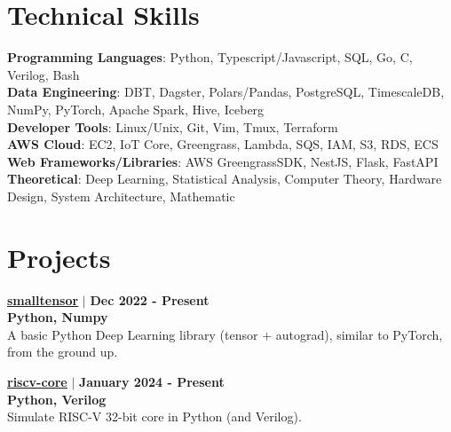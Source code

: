 \documentclass[letterpaper,9pt]{article}
\begin{document}
\section{\texorpdfstring{\textbf{\color{CornflowerBlue}Technical Skills}}{Technical Skills}}
 \begin{itemize}[leftmargin=0.15in, label={}]
    \small{\item{
     \textbf{Programming Languages}{: Python, Typescript/Javascript, SQL, Go, C, Verilog, Bash} \\
     \textbf{Data Engineering}{: DBT, Dagster, Polars/Pandas, PostgreSQL, TimescaleDB, NumPy, PyTorch, Apache Spark, Hive, Iceberg} \\
     \textbf{Developer Tools}{: Linux/Unix, Git, Vim, Tmux, Terraform} \\
     \textbf{AWS Cloud}{: EC2, IoT Core, Greengrass, Lambda, SQS, IAM, S3, RDS, ECS} \\
     \textbf{Web Frameworks/Libraries}{: AWS GreengrassSDK, NestJS, Flask, FastAPI} \\
     \textbf{Theoretical}{: Deep Learning, Statistical Analysis, Computer Theory, Hardware Design, System Architecture, Mathematic} \\
    }}
 \end{itemize}


\newpage
\section{\texorpdfstring{\textbf{\color{CornflowerBlue}Projects}}{Projects}}
\vspace{-15pt}
\setlength{\leftskip}{0.15in}
  \begin{multicols}{2}
    \textbf{\color{Green}\href{https://github.com/hbhungg/smalltensor}{\underline{smalltensor}}} $|$ \textbf{Dec 2022 - Present} \\ \vspace{1pt}
    {\footnotesize \textbf{Python, Numpy}} \\ \vspace{2pt}
    {\small A basic Python Deep Learning library (tensor + autograd), similar to PyTorch, from the ground up.} \\
    \columnbreak

    \textbf{\color{Green}\href{https://github.com/hbhungg/riscv-core}{\underline{riscv-core}}} $|$ \textbf{January 2024 - Present} \\ \vspace{1pt}
      {\footnotesize \textbf{Python, Verilog}}\\ \vspace{2pt}
      {\small Simulate RISC-V 32-bit core in Python (and Verilog).} \\
      \columnbreak
  \end{multicols}
\end{document}

